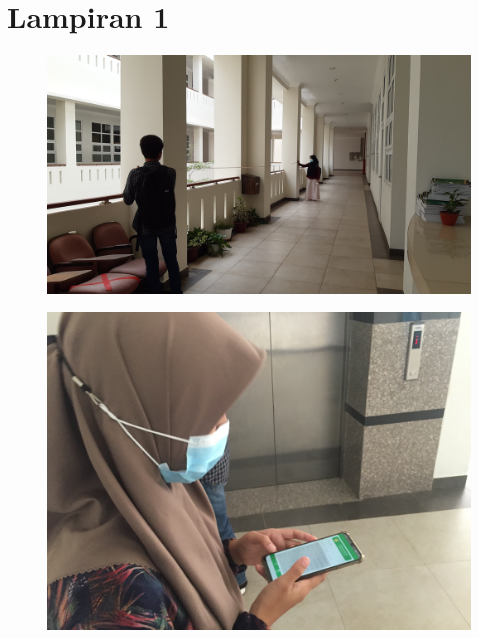 
\chapter*{Lampiran 1}
\begin{figure}[H]
  \center
  \includegraphics [width = 13.5 cm, height= 6.75 cm]{gambar/lampiran/lamp1a.jpg}
\end{figure}
\begin{figure}[H]
  \center
  \includegraphics [width = 13.5 cm, height= 6.75 cm]{gambar/lampiran/lamp1d.jpg}
\end{figure}

